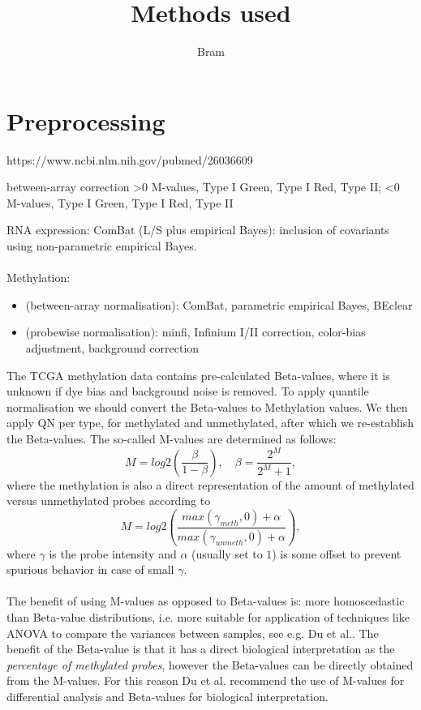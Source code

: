 \documentclass[a4paper,10pt]{article}
\title{Methods used}
\author{Bram}
\begin{document}
\section{Preprocessing}
%

https://www.ncbi.nlm.nih.gov/pubmed/26036609

between-array correction 
>0 M-values, Type I Green, Type I Red, Type II;
<0 M-values, Type I Green, Type I Red, Type II 

RNA expression: ComBat (L/S plus empirical Bayes): inclusion of covariants using non-parametric empirical Bayes. \\ \\
%
Methylation:
\begin{itemize}
 \item (between-array normalisation): ComBat, parametric empirical Bayes, BEclear
 \item (probewise normalisation): minfi, Infinium I/II correction, color-bias adjustment, background correction
\end{itemize}
%

The TCGA methylation data contains pre-calculated Beta-values, where it is unknown if dye bias and background noise is removed. 
To apply quantile normalisation we should convert the Beta-values to Methylation values. We then apply QN per type, for methylated and unmethylated, after which we re-establish the Beta-values.
%
The so-called M-values are determined as follows:
\begin{equation}
 M  = log2\left({\frac{\beta}{1-\beta}}\right), \quad \beta = \frac{2^M}{2^M+1},
\end{equation}
%
where the methylation is also a direct representation of the amount of methylated versus unmethylated probes according to
\begin{equation}
 M  = log2\left({\frac{max(\gamma_{meth},0)+\alpha}{max(\gamma_{unmeth},0)+\alpha}}\right),
\end{equation}
%
where $\gamma$ is the probe intensity and $\alpha$ (usually set to $1$) is some offset to prevent spurious behavior in case of small $\gamma$. \\ \\
%
The benefit of using M-values as opposed to Beta-values is: 
more homoscedastic than Beta-value distributions, i.e. more suitable for application of techniques like ANOVA to compare the variances between samples, see e.g. Du et al.\cite{Du2010}.
%
The benefit of the Beta-value is that it has a direct biological interpretation as the \textit{percentage of methylated probes}, however the Beta-values can be directly obtained from the M-values. For this reason Du et al.\cite{Du2010} recommend the use of M-values for differential analysis and Beta-values for biological interpretation. 
%
\end{document}
